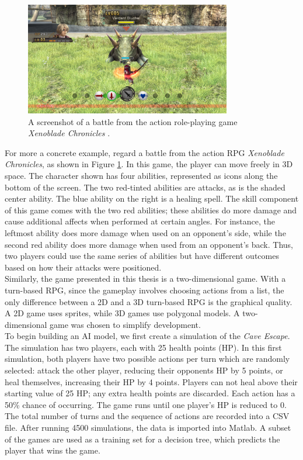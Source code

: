 \begin{figure}[H]
  \centering
  \includegraphics[width=9cm]{figures/Xenoblade.png}
  \caption{A screenshot of a battle from the action role-playing game \textit{Xenoblade Chronicles} \cite{xenoblade10}.}
  \label{fig:Xenoblade}
\end{figure}

For more a concrete example, regard a battle from the action RPG \textit{Xenoblade Chronicles}, as shown in Figure \ref{fig:Xenoblade}. In this game, the player can move freely in 3D space. The character shown has four abilities, represented as icons along the bottom of the screen. The two red-tinted abilities are attacks, as is the shaded center ability. The blue ability on the right is a healing spell. The skill component of this game comes with the two red abilities; these abilities do more damage and cause additional affects when performed at certain angles. For instance, the leftmost ability does more damage when used on an opponent's side, while the second red ability does more damage when used from an opponent's back. Thus, two players could use the same series of abilities but have different outcomes based on how their attacks were positioned.\\

Similarly, the game presented in this thesis is a two-dimensional game. With a turn-based RPG, since the gameplay involves choosing actions from a list, the only difference between a 2D and a 3D turn-based RPG is the graphical quality. A 2D game uses sprites, while 3D games use polygonal models. A two-dimensional game was chosen to simplify development.\\

To begin building an AI model, we first create a simulation of the \textit{Cave Escape}. The simulation has two players, each with 25 health points (HP). In this first simulation, both players have two possible actions per turn which are randomly selected: attack the other player, reducing their opponents HP by 5 points, or heal themselves, increasing their HP by 4 points. Players can not heal above their starting value of 25 HP; any extra health points are discarded. Each action has a 50\% chance of occurring. The game runs until one player's HP is reduced to 0. The total number of turns and the sequence of actions are recorded into a CSV file. After running 4500 simulations, the data is imported into Matlab. A subset of the games are used as a training set for a decision tree, which predicts the player that wins the game.\\

